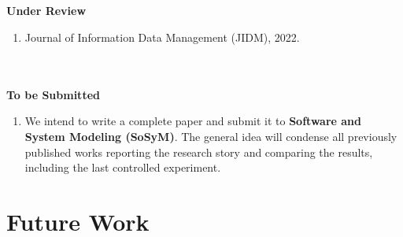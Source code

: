 \\~\\


\\~\\
\textbf{Under Review}  

\begin{enumerate}[label=\roman*.]
    \item Journal of Information Data Management (JIDM), 2022.
\end{enumerate} 

\linebreak
\\~\\
\textbf{To be Submitted} 
    \begin{enumerate}[label=\roman*.]
        \item We intend to write a complete paper and submit it to \textbf{Software and System Modeling (SoSyM)}.
        The general idea will condense all previously published works reporting the research story and comparing the results, including the last controlled experiment.
    \end{enumerate} 

\section{Future Work}

